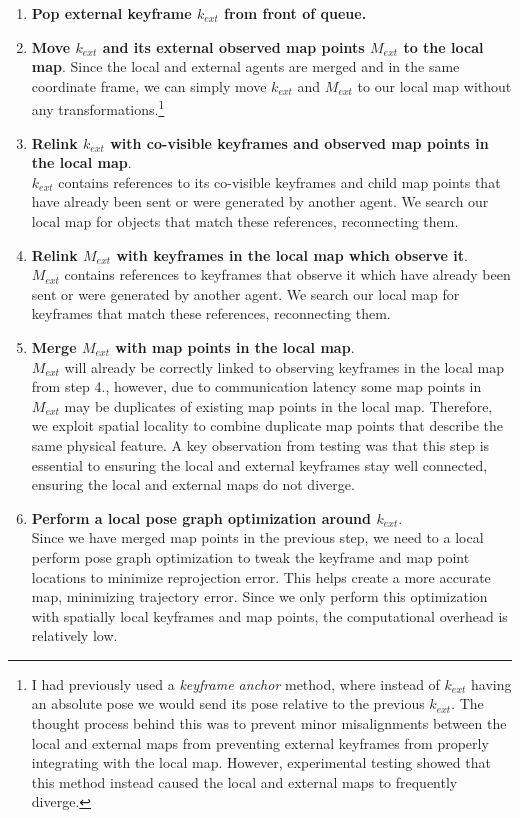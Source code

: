 \begin{enumerate}
    \item \textbf{Pop external keyframe $k_{ext}$ from front of queue.}
    \item \textbf{Move $k_{ext}$ and its external observed map points $M_{ext}$ to the local map}.
          Since the local and external agents are merged and in the same coordinate frame, we can simply move $k_{ext}$ and $M_{ext}$ to our local map without any transformations.\footnote[1]{I had previously used a \textit{keyframe anchor} method, where instead of $k_{ext}$ having an absolute pose we would send its pose relative to the previous $k_{ext}$. The thought process behind this was to prevent minor misalignments between the local and external maps from preventing external keyframes from properly integrating with the local map. However, experimental testing showed that this method instead caused the local and external maps to frequently diverge.}
    \item \textbf{Relink $k_{ext}$ with co-visible keyframes and observed map points in the local map}. \\
          $k_{ext}$ contains references to its co-visible keyframes and child map points that have already been sent or were generated by another agent. We search our local map for objects that match these references, reconnecting them.
    \item \textbf{Relink $M_{ext}$ with keyframes in the local map which observe it}. \\
          $M_{ext}$ contains references to keyframes that observe it which have already been sent or were generated by another agent. We search our local map for keyframes that match these references, reconnecting them.
    \item \textbf{Merge $M_{ext}$ with map points in the local map}. \\
          $M_{ext}$ will already be correctly linked to observing keyframes in the local map from step 4., however, due to communication latency some map points in $M_{ext}$ may be duplicates of existing map points in the local map. Therefore, we exploit spatial locality to combine duplicate map points that describe the same physical feature. A key observation from testing was that this step is essential to ensuring the local and external keyframes stay well connected, ensuring the local and external maps do not diverge.
    \item \textbf{Perform a local pose graph optimization around $k_{ext}$}. \\
          Since we have merged map points in the previous step, we need to a local perform pose graph optimization to tweak the keyframe and map point locations to minimize reprojection error. This helps create a more accurate map, minimizing trajectory error. Since we only perform this optimization with spatially local keyframes and map points, the computational overhead is relatively low.
\end{enumerate}


